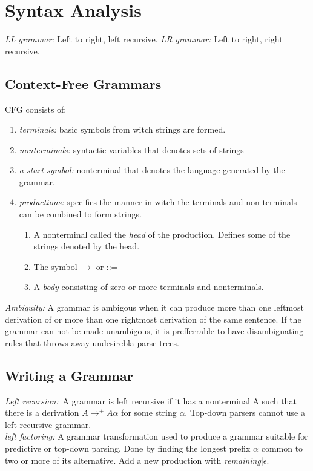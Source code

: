 \section{Syntax Analysis}
\emph{LL grammar:} Left to right, left recursive. \emph{LR grammar:} Left to right, right recursive. \\

\subsection{Context-Free Grammars}
CFG consists of:
\begin{enumerate}
	\item{\emph{terminals:} basic symbols from witch strings are formed. 			}
	\item{\emph{nonterminals:} syntactic variables that denotes sets of strings 	}
	\item{\emph{a start symbol:} nonterminal that denotes the language generated by the grammar. }
	\item{\emph{productions:} specifies the manner in witch the terminals and non terminals can be combined to form strings. 	}
	\begin{enumerate}
		\item{A nonterminal called the \emph{head} of the production. Defines some of the strings denoted by the head.}
		\item{The symbol $\rightarrow$ or ::=}
		\item{A \emph{body} consisting of zero or more terminals and nonterminals.}
	\end{enumerate}
\end{enumerate}

\emph{Ambiguity: } A grammar is ambigous when it can produce more than one leftmost derivation of or more than one rightmost derivation of the same sentence. If the grammar can not be made unambigous, it is prefferrable to have disambiguating rules that throws away undesirebla parse-trees.

\subsection{Writing a Grammar}
\emph{Left recursion:} A grammar is left recursive if it has a nonterminal A such that there is a derivation $A \rightarrow^+ A\alpha$ for some string $\alpha$. Top-down parsers cannot use a left-recursive grammar. \\
\emph{left factoring:} A grammar transformation used to produce a grammar suitable for predictive or top-down parsing. Done by finding the longest prefix $\alpha$ common to two or more of its alternative. Add a new production with \emph{remaining}|$\epsilon$. \\

